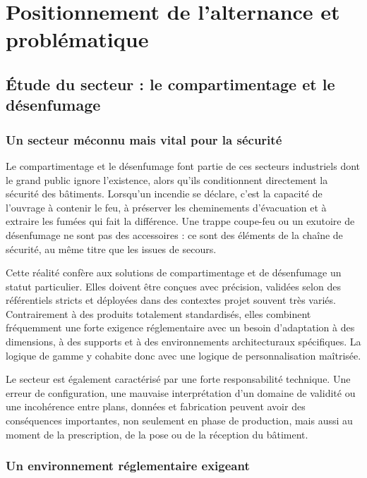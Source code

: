 \chapter{Positionnement de l'alternance et problématique}

\section{Étude du secteur : le compartimentage et le désenfumage}

\subsection{Un secteur méconnu mais vital pour la sécurité}

Le compartimentage et le désenfumage font partie de ces secteurs industriels dont le grand public ignore l'existence, alors qu'ils conditionnent directement la sécurité des bâtiments. Lorsqu'un incendie se déclare, c'est la capacité de l'ouvrage à contenir le feu, à préserver les cheminements d'évacuation et à extraire les fumées qui fait la différence. Une trappe coupe-feu ou un exutoire de désenfumage ne sont pas des accessoires : ce sont des éléments de la chaîne de sécurité, au même titre que les issues de secours.

Cette réalité confère aux solutions de compartimentage et de désenfumage un statut particulier. Elles doivent être conçues avec précision, validées selon des référentiels stricts et déployées dans des contextes projet souvent très variés. Contrairement à des produits totalement standardisés, elles combinent fréquemment une forte exigence réglementaire avec un besoin d'adaptation à des dimensions, à des supports et à des environnements architecturaux spécifiques. La logique de gamme y cohabite donc avec une logique de personnalisation maîtrisée.

Le secteur est également caractérisé par une forte responsabilité technique. Une erreur de configuration, une mauvaise interprétation d'un domaine de validité ou une incohérence entre plans, données et fabrication peuvent avoir des conséquences importantes, non seulement en phase de production, mais aussi au moment de la prescription, de la pose ou de la réception du bâtiment.

\subsection{Un environnement réglementaire exigeant}

